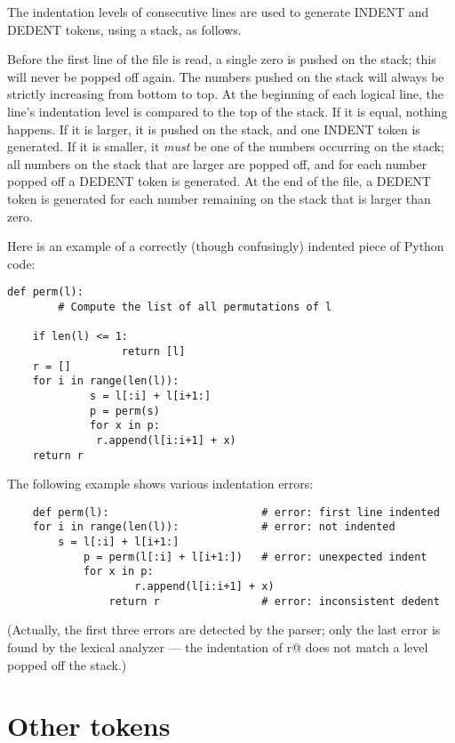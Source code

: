 The indentation levels of consecutive lines are used to generate
INDENT and DEDENT tokens, using a stack, as follows.

Before the first line of the file is read, a single zero is pushed on
the stack; this will never be popped off again.  The numbers pushed on
the stack will always be strictly increasing from bottom to top.  At
the beginning of each logical line, the line's indentation level is
compared to the top of the stack.  If it is equal, nothing happens.
If it is larger, it is pushed on the stack, and one INDENT token is
generated.  If it is smaller, it {\em must} be one of the numbers
occurring on the stack; all numbers on the stack that are larger are
popped off, and for each number popped off a DEDENT token is
generated.  At the end of the file, a DEDENT token is generated for
each number remaining on the stack that is larger than zero.

Here is an example of a correctly (though confusingly) indented piece
of Python code:

\begin{verbatim}
def perm(l):
        # Compute the list of all permutations of l

    if len(l) <= 1:
                  return [l]
    r = []
    for i in range(len(l)):
             s = l[:i] + l[i+1:]
             p = perm(s)
             for x in p:
              r.append(l[i:i+1] + x)
    return r
\end{verbatim}

The following example shows various indentation errors:

\begin{verbatim}
    def perm(l):                        # error: first line indented
    for i in range(len(l)):             # error: not indented
        s = l[:i] + l[i+1:]
            p = perm(l[:i] + l[i+1:])   # error: unexpected indent
            for x in p:
                    r.append(l[i:i+1] + x)
                return r                # error: inconsistent dedent
\end{verbatim}

(Actually, the first three errors are detected by the parser; only the
last error is found by the lexical analyzer --- the indentation of
\verb@return r@ does not match a level popped off the stack.)

\section{Other tokens}


